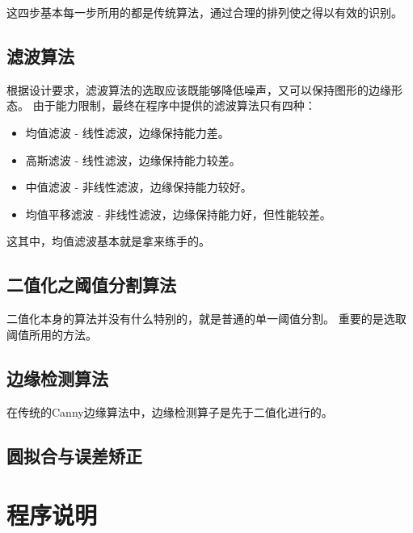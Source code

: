 \documentclass[12pt,a4paper]{report}
\begin{document}
这四步基本每一步所用的都是传统算法，通过合理的排列使之得以有效的识别。

\subsection{滤波算法}

根据设计要求，滤波算法的选取应该既能够降低噪声，又可以保持图形的边缘形态。
由于能力限制，最终在程序中提供的滤波算法只有四种：
\begin{itemize}
    \item 均值滤波 - 线性滤波，边缘保持能力差。
    \item 高斯滤波 - 线性滤波，边缘保持能力较差。
    \item 中值滤波 - 非线性滤波，边缘保持能力较好。
    \item 均值平移滤波 - 非线性滤波，边缘保持能力好，但性能较差。
\end{itemize}
这其中，均值滤波基本就是拿来练手的。

\lipsum[1]

\subsection{二值化之阈值分割算法}

二值化本身的算法并没有什么特别的，就是普通的单一阈值分割。
重要的是选取阈值所用的方法。

\lipsum[1]

\subsection{边缘检测算法}

在传统的Canny边缘算法中，边缘检测算子是先于二值化进行的。

\lipsum[1]

\subsection{圆拟合与误差矫正}

\lipsum[1]

\section{程序说明}

\lipsum[1]
\end{document}
